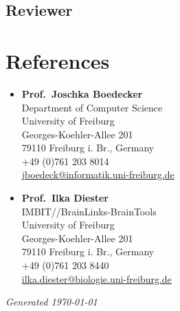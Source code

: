 \documentclass[12pt,a4paper]{moderncv}        %
\begin{document}
\subsection{Reviewer}

\section{\textbf{References}}
\begin{itemize}
    \item \textbf{Prof.~Joschka Boedecker}\\
        Department of Computer Science\\
        University of Freiburg\\
        Georges-Koehler-Allee 201\\
        79110 Freiburg i. Br., Germany\\
        +49 (0)761 203 8014\\
        \href{mailto: jboedeck@informatik.uni-freiburg.de}{jboedeck@informatik.uni-freiburg.de}\\
    \item \textbf{Prof.~Ilka Diester}\\
        IMBIT//BrainLinks-BrainTools\\
        University of Freiburg\\
        Georges-Koehler-Allee 201\\
        79110 Freiburg i. Br., Germany\\
        +49 (0)761 203 8440\\
        \href{mailto: ilka.diester@biologie.uni-freiburg.de}{ilka.diester@biologie.uni-freiburg.de}
\end{itemize}

\begin{center}
    \footnotesize
    \textit{Generated \today}
\end{center}
\end{document}
